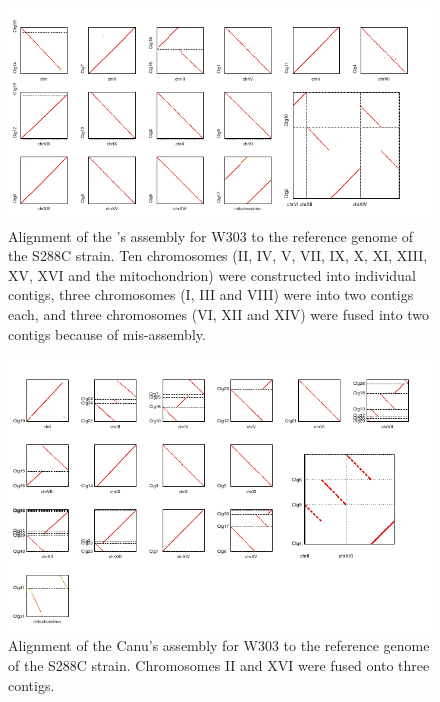 \begin{figure}[!hpt]
\centering
\includegraphics[width=19cm]{images/suppFigure3.pdf}
\caption[Alignment of the  \npscarf{}'s assembly for \sce{} W303 to the reference
genome of the S288C strain]{Alignment of the  \npscarf{}'s assembly for \sce{} W303 to the reference genome of the S288C strain. Ten chromosomes (II, IV, V, VII, IX, X, XI, XIII, XV, XVI and the mitochondrion) were constructed into individual contigs, three chromosomes (I, III and VIII) were into two contigs each, and three chromosomes (VI, XII and XIV) were fused into two contigs because of mis-assembly.}
\label{SF:alignW303rt}
\end{figure}


\begin{figure}[!hpt]
\centering
\includegraphics[width=19cm]{images/suppFigure4.pdf}
\caption[Alignment of the Canu's assembly for \sce{} W303 to the reference
genome of the S288C strain]{Alignment of the Canu's assembly for \sce{} W303 to the reference genome of the S288C strain.  Chromosomes II and XVI were fused onto three
contigs.
}
\label{SF:alignW303Canu}
\end{figure}


